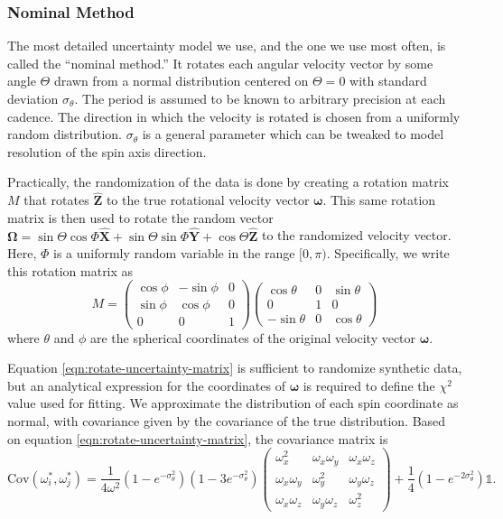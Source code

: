 \documentclass[11pt]{article}
\newcommand{\unit}[1]{\hat{\mathbf{#1}}}
\newcommand{\parens}[1]{\left( #1 \right)}
\begin{document}
\subsubsection{Nominal Method}
The most detailed uncertainty model we use, and the one we use most often, is called the ``nominal method.'' It rotates each angular velocity vector by some angle $\Theta$ drawn from a normal distribution centered on $\Theta=0$ with standard deviation $\sigma_\theta$. The period is assumed to be known to arbitrary precision at each cadence. The direction in which the velocity is rotated is chosen from a uniformly random distribution. $\sigma_\theta$ is a general parameter which can be tweaked to model resolution of the spin axis direction.

Practically, the randomization of the data is done by creating a rotation matrix $M$ that rotates $\unit Z$ to the true rotational velocity vector $\bm \omega$. This same rotation matrix is then used to rotate the random vector $\bm \Omega = \sin \Theta \cos\Phi \unit X + \sin \Theta \sin \Phi\unit Y + \cos \Theta\unit Z$ to the randomized velocity vector. Here, $\Phi$ is a uniformly random variable in the range $[0, \pi)$. Specifically, we write this rotation matrix as
\begin{equation}
M = \parens{\begin{matrix}
\cos \phi & -\sin \phi & 0\\
\sin \phi & \cos \phi & 0\\
0 & 0 & 1
\end{matrix}}
\parens{\begin{matrix}
\cos \theta & 0 & \sin \theta \\
0 & 1 & 0\\
-\sin \theta & 0 & \cos \theta
\end{matrix}}
\label{eqn:rotate-uncertainty-matrix}
\end{equation}
where $\theta$ and $\phi$ are the spherical coordinates of the original velocity vector $\bm \omega.$

Equation \ref{eqn:rotate-uncertainty-matrix} is sufficient to randomize synthetic data, but an analytical expression for the coordinates of $\bm \omega$ is required to define the $\chi^2$ value used for fitting. We approximate the distribution of each spin coordinate as normal, with covariance given by the covariance of the true distribution. Based on equation \ref{eqn:rotate-uncertainty-matrix}, the covariance matrix is
\begin{equation}
\text{Cov}(\omega^*_i, \omega^*_j) = \frac{1}{4 \omega^2}\parens{1-e^{-\sigma_\theta^2}} \parens{1-3e^{-\sigma_\theta^2}}\parens{\begin{matrix}
\omega_x^2 & \omega_x \omega_y& \omega_x \omega_z\\
\omega_x \omega_y & \omega_y^2 & \omega_y \omega_z\\
\omega_x \omega_z & \omega_y \omega_z& \omega_z^2
\end{matrix}} +  \frac{1}{4}\parens{1 - e^{-2\sigma_\theta^2}} \mathbb{1}.
\label{eqn:rotate-uncertainty-var}
\end{equation}
\end{document}
